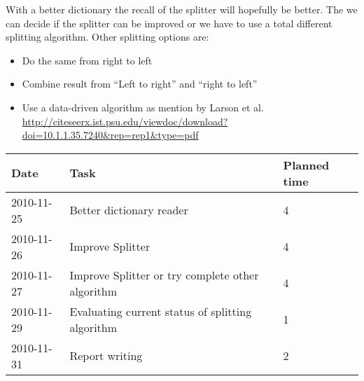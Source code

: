 \documentclass[11pt, accentcolor=tud9b, nochapname]{tudexercise}
\begin{document}
With a better dictionary the recall of the splitter will hopefully be better. The we can decide if the splitter can be improved or we have to use a total different splitting algorithm. Other splitting options are:

\begin{itemize}
  \item Do the same from right to left
  \item Combine result from ``Left to right'' and ``right to left''
  \item Use a data-driven algorithm as mention by Larson et al. \url{http://citeseerx.ist.psu.edu/viewdoc/download?doi=10.1.1.35.7240\&rep=rep1\&type=pdf}
\end{itemize}


\vspace{10pt}
\begin{tabular}{l | l | l}
  \hline
  \textbf{Date} & \textbf{Task} & \textbf{Planned time} \\ \hline
  2010-11-25 & Better dictionary reader & 4 \\ \hline
  2010-11-26 & Improve Splitter & 4 \\ \hline
  2010-11-27 & Improve Splitter or try complete other algorithm & 4 \\ \hline
  2010-11-29 & Evaluating current status of splitting algorithm & 1 \\ \hline
  2010-11-31 & Report writing & 2 \\ \hline
\end{tabular}
\end{document}
